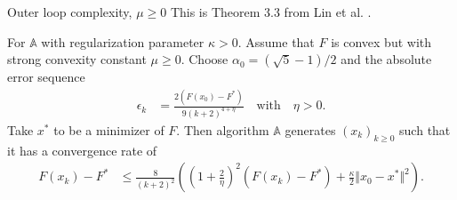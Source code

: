 \documentclass[11pt]{beamer}
\theoremstyle{definition}
\begin{document}
        \begin{frame}{Outer loop complexity, $\mu \ge 0$}
            This is Theorem 3.3 from Lin et al. \cite{lin_universal_2015}. 
            \begin{theorem}[]\label{thm:erro-seq-outer-cnvx}
            {\small
                For $\mathbb A$ with regularization parameter $\kappa > 0$.
                Assume that $F$ is convex but with strong convexity constant $\mu \ge 0$. 
                Choose $\alpha_0 = (\sqrt{5} - 1)/2$ and the absolute error sequence 
                \begin{align*}
                    \epsilon_k &= \frac{2(F(x_0) - F^*)}{9(k + 2)^{4 + \eta}} \quad 
                    \text{with}\quad \eta > 0. 
                \end{align*}
                Take $x^*$ to be a minimizer of $F$. 
                Then algorithm $\mathbb A$ generates $(x_k)_{k \ge0}$ such that it has a convergence rate of 
                \begin{align*}
                    F(x_k) - F^* &\le 
                    \frac{8}{(k + 2)^2}\left(
                        \left(1 + \frac{2}{\eta}\right)^2(F(x_k) - F^*)
                        + \frac{\kappa}{2}\Vert x_0 - x^*\Vert^2
                    \right).
                \end{align*}
            }
            \end{theorem}
        \end{frame}
\end{document}
